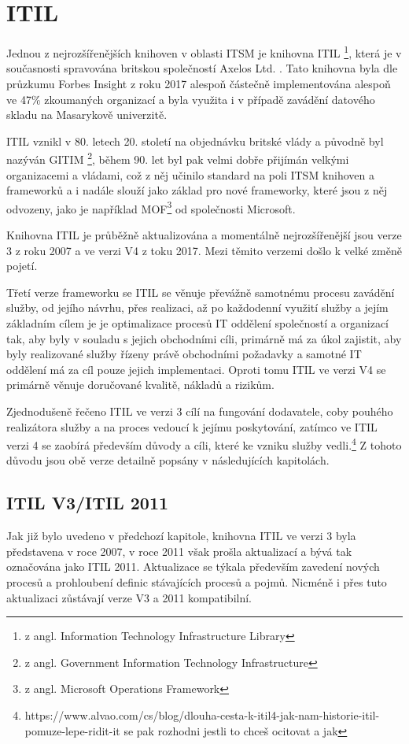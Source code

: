 \documentclass[
  digital,     %
  twoside,     %
  lof,         %
  lot,         %
]{fithesis4}
\begin{document}
\section{ITIL}
Jednou z nejrozšířenějších knihoven v oblasti ITSM je knihovna ITIL \footnote{z angl. Information Technology Infrastructure Library}, která je v současnosti spravována britskou společností Axelos Ltd. \parencite[s.~31]{Matula2017}. Tato knihovna byla dle průzkumu Forbes Insight z roku 2017 alespoň částečně implementována alespoň ve 47\% zkoumaných organizací\parencite{Watts3082017} a byla využita i v případě zavádění datového skladu na Masarykově univerzitě. 

ITIL vznikl v 80. letech 20. století na objednávku britské vlády a původně byl nazýván GITIM \footnote{z angl. Government Information Technology Infrastructure}, během 90. let byl pak velmi dobře přijímán velkými organizacemi a vládami, což z něj učinilo standard na poli ITSM knihoven a frameworků a i nadále slouží jako základ pro nové frameworky, které jsou z něj odvozeny, jako je například MOF\footnote{z angl. Microsoft Operations Framework} od společnosti Microsoft. \parencite[s. ~31]{Matula2017}

Knihovna ITIL je průběžně aktualizována a momentálně nejrozšířenější jsou verze 3 z roku 2007 a ve verzi V4 z toku 2017. Mezi těmito verzemi došlo k velké změně pojetí. 

Třetí verze frameworku se ITIL se věnuje převážně samotnému procesu zavádění služby, od jejího návrhu, přes realizaci, až po každodenní využití služby a jejím základním cílem je je optimalizace procesů IT oddělení společností a organizací tak, aby byly v souladu s jejich obchodními cíli, primárně má za úkol zajistit, aby byly realizované služby řízeny právě obchodními požadavky a samotné IT oddělení má za cíl pouze jejich implementaci.\parencite[s.~8]{Carlidge2007} Oproti tomu ITIL ve verzi V4 se primárně věnuje doručované kvalitě, nákladů a rizikům. 

Zjednodušeně řečeno ITIL ve verzi 3 cílí na fungování dodavatele, coby pouhého realizátora služby a na proces vedoucí k jejímu poskytování, zatímco ve ITIL verzi 4 se zaobírá především důvody a cíli, které ke vzniku služby vedli.\footnote{https://www.alvao.com/cs/blog/dlouha-cesta-k-itil4-jak-nam-historie-itil-pomuze-lepe-ridit-it se pak rozhodni jestli to chceš ocitovat a jak}
Z tohoto důvodu jsou obě verze detailně popsány v následujících kapitolách.  
\subsection{ITIL V3/ITIL 2011}
Jak již bylo uvedeno v předchozí kapitole, knihovna ITIL ve verzi 3 byla představena v roce 2007, v roce 2011 však prošla aktualizací a bývá tak označována jako ITIL 2011. Aktualizace se týkala především zavedení nových procesů a prohloubení definic stávajících procesů a pojmů. Nicméně i přes tuto aktualizaci zůstávají verze V3 a 2011 kompatibilní.\parencite{Kempter2722013}
\end{document}
